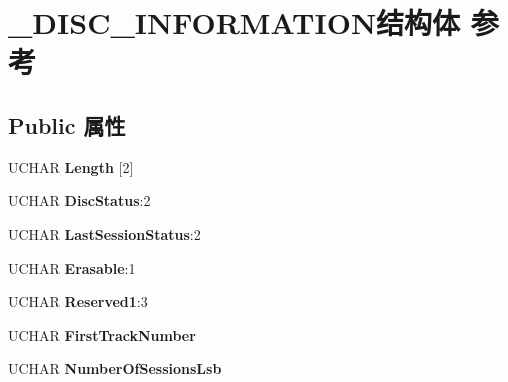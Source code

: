 \hypertarget{struct___d_i_s_c___i_n_f_o_r_m_a_t_i_o_n}{}\section{\+\_\+\+D\+I\+S\+C\+\_\+\+I\+N\+F\+O\+R\+M\+A\+T\+I\+O\+N结构体 参考}
\label{struct___d_i_s_c___i_n_f_o_r_m_a_t_i_o_n}
\subsection*{Public 属性}
\begin{DoxyCompactItemize}
\item 
\mbox{\label{struct___d_i_s_c___i_n_f_o_r_m_a_t_i_o_n_ad74272291191a0fd09b00c845fa3f2fc}} 
U\+C\+H\+AR {\bfseries Length} \mbox{[}2\mbox{]}
\item 
\mbox{\label{struct___d_i_s_c___i_n_f_o_r_m_a_t_i_o_n_a70f577d290402363658a6faabbd60622}} 
U\+C\+H\+AR {\bfseries Disc\+Status}\+:2
\item 
\mbox{\label{struct___d_i_s_c___i_n_f_o_r_m_a_t_i_o_n_a7baded47d13483de419e7bbba835d070}} 
U\+C\+H\+AR {\bfseries Last\+Session\+Status}\+:2
\item 
\mbox{\label{struct___d_i_s_c___i_n_f_o_r_m_a_t_i_o_n_a84c9e45fc06fee619815039f98b16bf7}} 
U\+C\+H\+AR {\bfseries Erasable}\+:1
\item 
\mbox{\label{struct___d_i_s_c___i_n_f_o_r_m_a_t_i_o_n_abcbdb0c80e44623b0c855a1dbd93269e}} 
U\+C\+H\+AR {\bfseries Reserved1}\+:3
\item 
\mbox{\label{struct___d_i_s_c___i_n_f_o_r_m_a_t_i_o_n_a7451ea14a4d214237f30e62525c5343a}} 
U\+C\+H\+AR {\bfseries First\+Track\+Number}
\item 
\mbox{\label{struct___d_i_s_c___i_n_f_o_r_m_a_t_i_o_n_a5e91d82271bc64afe4efe0c256e0cbd1}} 
U\+C\+H\+AR {\bfseries Number\+Of\+Sessions\+Lsb}

\end{DoxyCompactItemize}
